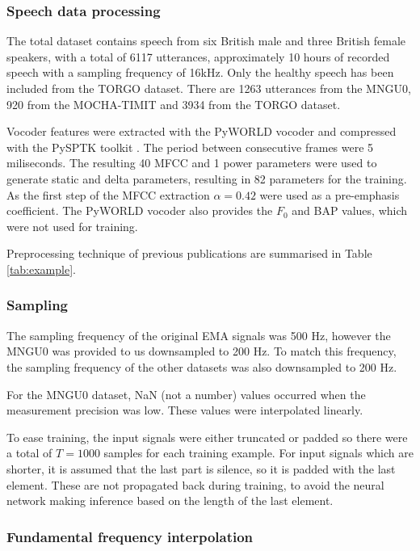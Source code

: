\documentclass[a4paper]{article}
\begin{document}
\subsubsection{Speech data processing}


The total dataset contains speech from six British male and three British
female speakers, with a total of 6117 utterances, approximately 10 hours of recorded
speech with a sampling frequency of 16kHz.
Only the healthy speech has been included from the TORGO dataset. There are 1263 utterances from the
MNGU0, 920 from the MOCHA-TIMIT and 3934 from the TORGO dataset.

Vocoder features were extracted with the PyWORLD vocoder \cite{Morise2016}
and compressed with the PySPTK toolkit \cite{pysptk}. The period between consecutive
frames were 5 miliseconds. The resulting 40 MFCC and 1 power parameters
were used to generate static and delta parameters, resulting in 82
parameters for the training. As the first step of the MFCC extraction \( \alpha
= 0.42 \) were used as a pre-emphasis coefficient. The PyWORLD vocoder
also provides the $ F_0 $ and BAP values, which were not used for training.

Preprocessing technique of previous publications are summarised in Table \ref{tab:example}.
\subsubsection{Sampling}

The sampling frequency of the original EMA signals was 500 Hz, however
the MNGU0 was provided to us downsampled to 200 Hz. To match this frequency,
the sampling frequency of the other datasets was also downsampled to 200 Hz.

For the MNGU0 dataset, NaN (not a number) values occurred when the measurement precision
was low. These values were interpolated linearly. 

To ease training, the input signals were either truncated or padded
so there were a total of \( T = 1000 \) samples for each training example.
For input signals which are shorter, it is assumed that the last part is
silence, so it is padded with the last element. These are not propagated back during training, to avoid the neural network making inference based on the length of the last element.

\subsubsection{Fundamental frequency interpolation}
\end{document}
